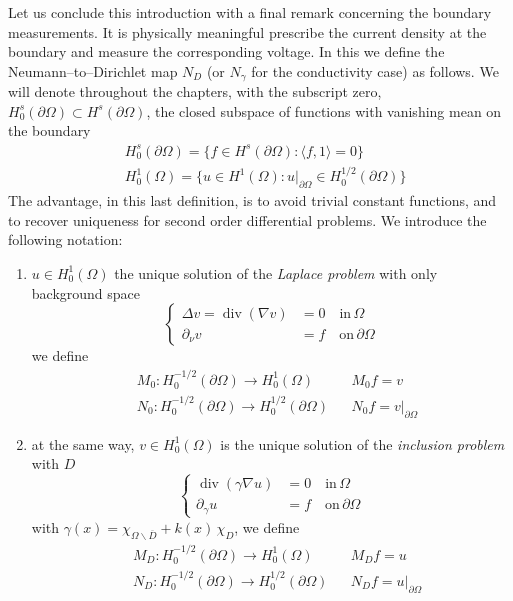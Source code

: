 \documentclass[10pt, a4paper, twoside, openright]{book}
\theoremstyle{definition}
\theoremstyle{plain}
\theoremstyle{plain}
\theoremstyle{plain}
\theoremstyle{plain}
\theoremstyle{plain}
\theoremstyle{plain}
\theoremstyle{plain}
\theoremstyle{plain}
\DeclareMathOperator{\divergence}{div}
\begin{document}
Let us conclude this introduction with a final remark concerning the boundary measurements.
It is physically meaningful prescribe the current density at the boundary and measure the corresponding voltage.
In this we define the Neumann--to--Dirichlet map $N_D$ (or $N_\gamma$ for the conductivity case) as follows.
We will denote throughout the chapters, with the subscript zero, $H^s_0(\partial\Omega)\subset H^s(\partial\Omega)$, the closed subspace of functions with vanishing mean on the boundary
\begin{align}
&H^s_0(\partial\Omega) = \Big\{ f \in H^s(\partial\Omega): \langle f,1\rangle = 0\Big\}\\
&H^1_0(\Omega) = \Big\{ u \in H^1(\Omega): u|_{\partial\Omega} \in H^{1/2}_0(\partial\Omega)\Big\}
\end{align}
The advantage, in this last definition, is to avoid trivial constant functions, and to recover uniqueness for second order differential problems.
We introduce the following notation:
\begin{enumerate}
 \item $u\in H^1_0(\Omega)$ the unique solution of the \emph{Laplace problem} with only background space
 \begin{equation}
 \label{eq:NtoD-laplace}
  \left\{
  \begin{aligned}
  \Delta v = \divergence(\nabla v) &= 0 \quad\text{in}\,\Omega \\
            \partial_\nu v &= f \quad\text{on}\,\partial \Omega
  \end{aligned}
  \right.
 \end{equation}
 we define
 \begin{align}
 &M_0: H^{-1/2}_0(\partial \Omega) \to H^1_0(\Omega) && M_0f = v \label{eq:def-T_0}\\
 &{N_0}: H^{-1/2}_0(\partial \Omega) \to H^{1/2}_0(\partial\Omega) && {N_0} f = v|_{\partial\Omega}
 \end{align}
 \item at the same way, $v\in H^1_0(\Omega)$ is the unique solution of the \emph{inclusion problem} with $D$
 \begin{equation}
 \label{eq:NtoD-inclusion}
  \left\{
  \begin{aligned}
  \divergence(\gamma\nabla u) &= 0 \quad\text{in}\,\Omega \\
            \partial_\gamma u &= f \quad\text{on}\,\partial \Omega
  \end{aligned}
  \right.
 \end{equation}
 with $\gamma(x) = \chi_{\Omega\backslash\overline{D}} + k(x)\,\chi_D$, we define
 \begin{align}
 &M_D: H^{-1/2}_0(\partial \Omega) \to H^1_0(\Omega) && M_Df = u \label{eq:def-T_D}\\
 &{N_D}: H^{-1/2}_0(\partial \Omega) \to H^{1/2}_0(\partial\Omega) && {N_D}f = u|_{\partial\Omega}
 \end{align}
\end{enumerate}
\end{document}
